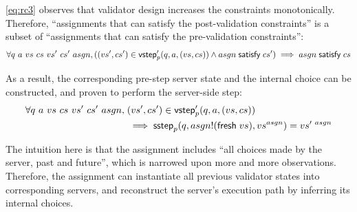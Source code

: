 \autoref{eq:rc3} observes that validator design increases the constraints
monotonically.  Therefore, ``assignments that can satisfy the post-validation
constraints'' is a subset of ``assignments that can satisfy the pre-validation
constraints'':
\[\forall q~a~vs~cs~vs'~cs'~asgn,((vs',cs')\in\mathsf{vstep}_p'(q,a,(vs,cs))\wedge asgn\;\mathsf{satisfy}\;cs')\implies asgn\;\mathsf{satisfy}\;cs\]

As a result, the corresponding pre-step server state and the internal choice can
be constructed, and proven to perform the server-side step:
\begin{align*}
\forall q~a~vs~cs~vs'~cs'~asgn,\;&(vs',cs')\in\mathsf{vstep}_p'(q,a,(vs,cs))\\
&\implies\mathsf{sstep}_p(q,asgn!(\mathsf{fresh}\;{vs}),vs^{asgn})=vs'^{~asgn}
\end{align*}

The intuition here is that the assignment includes ``all choices made by the
server, past and future'', which is narrowed upon more and more observations.
Therefore, the assignment can instantiate all previous validator states into
corresponding servers, and reconstruct the server's execution path by inferring
its internal choices.
